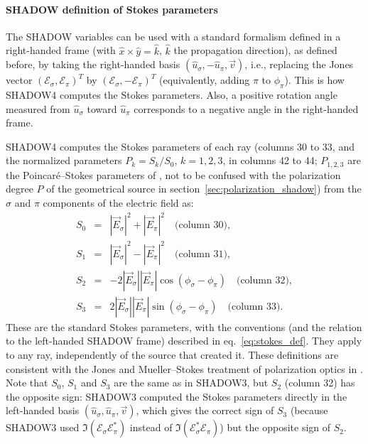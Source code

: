 \documentclass{iucr}
\begin{document}
\paragraph{SHADOW definition of Stokes parameters}
The SHADOW variables can be used with a standard formalism defined in a right-handed frame (with $\hat{x}\times\hat{y}=\hat{k}$, $\hat{k}$ the propagation direction), as defined before, by taking the right-handed basis $(\hat{u}_\sigma, -\hat{u}_\pi, \vec{v})$, i.e., replacing the Jones vector $(\mathcal{E}_\sigma,\mathcal{E}_\pi)^T$ by $(\mathcal{E}_\sigma,-\mathcal{E}_\pi)^T$ (equivalently, adding $\pi$ to $\phi_\pi$). This is how SHADOW4 computes the Stokes parameters. 
Also, a positive rotation angle measured from $\hat{u}_\sigma$ toward $\hat{u}_\pi$ corresponds to a negative angle in the right-handed frame.

SHADOW4 computes the Stokes parameters of each ray (columns 30 to 33, and the normalized parameters $P_k=S_k/S_0$, $k=1,2,3$, in columns 42 to 44; $P_{1,2,3}$ are the Poincar\'e--Stokes parameters of \cite{Detlefs2012}, not to be confused with the polarization degree $P$ of the geometrical source in section~\ref{sec:polarization_shadow}) from the $\sigma$ and $\pi$ components of the electric field as:
\begin{eqnarray}\label{eq:stokes_columns}
    S_0 &=& |\vec{E}_\sigma|^2 + |\vec{E}_\pi|^2 \quad \text{(column 30)}, \nonumber \\
    S_1 &=& |\vec{E}_\sigma|^2 - |\vec{E}_\pi|^2 \quad \text{(column 31)}, \nonumber \\
    S_2 &=& -2|\vec{E}_\sigma||\vec{E}_\pi|\cos(\phi_\sigma-\phi_\pi) \quad \text{(column 32)}, \nonumber \\
    S_3 &=& 2|\vec{E}_\sigma||\vec{E}_\pi|\sin(\phi_\sigma-\phi_\pi) \quad \text{(column 33)}.
\end{eqnarray}
These are the standard Stokes parameters, with the conventions (and the relation to the left-handed SHADOW frame) described in eq.~\ref{eq:stokes_def}. They apply to any ray, independently of the source that created it. These definitions are consistent with the Jones and Mueller--Stokes treatment of polarization optics in \cite{PolarizationDraft}.
Note that $S_0$, $S_1$ and $S_3$ are the same as in SHADOW3, but $S_2$ (column 32) has the opposite sign: SHADOW3 computed the Stokes parameters directly in the left-handed basis $(\hat{u}_\sigma,\hat{u}_\pi,\vec{v})$, which gives the correct sign of $S_3$ (because SHADOW3 used $\Im(\mathcal{E}_\sigma \mathcal{E}_\pi^*)$ instead of $\Im(\mathcal{E}_\sigma^* \mathcal{E}_\pi)$) but the opposite sign of $S_2$.
\end{document}

